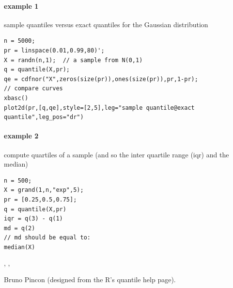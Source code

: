 \begin{examples}
\paragraph{example 1} sample quantiles versus exact quantiles for the Gaussian distribution
\begin{Verbatim}
n = 5000;
pr = linspace(0.01,0.99,80)';
X = randn(n,1);  // a sample from N(0,1)
q = quantile(X,pr);
qe = cdfnor("X",zeros(size(pr)),ones(size(pr)),pr,1-pr);
// compare curves
xbasc()
plot2d(pr,[q,qe],style=[2,5],leg="sample quantile@exact quantile",leg_pos="dr")
\end{Verbatim}

\paragraph{example 2} compute quartiles of a sample (and so the inter quartile range (iqr) and the median)
\begin{Verbatim}
n = 500;
X = grand(1,n,"exp",5);
pr = [0.25,0.5,0.75];
q = quantile(X,pr)
iqr = q(3) - q(1)
md = q(2)
// md should be equal to:
median(X)
\end{Verbatim}

\end{examples}

\begin{manseealso}
   , , 
\end{manseealso}

\begin{authors}
  Bruno Pincon (designed from the R's quantile help page).
\end{authors}

